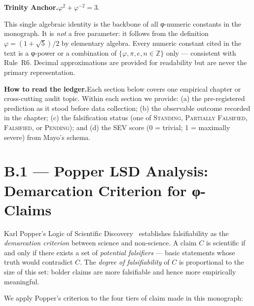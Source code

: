 \medskip

\noindent\textbf{Trinity Anchor.}\quad $\varphi^{2} + \varphi^{-2} = 3$.

\medskip

\noindent This single algebraic identity is the backbone of all φ-numeric
constants in the monograph.  It is \emph{not} a free parameter: it follows from
the definition $\varphi = (1+\sqrt{5})/2$ by elementary algebra.  Every
numeric constant cited in the text is a φ-power or a combination of
$\{φ, π, e, n \in \mathbb{Z}\}$ only — consistent with Rule~R6.  Decimal
approximations are provided for readability but are never the primary
representation.

\medskip

\noindent\textbf{How to read the ledger.}\quad Each section below covers one
empirical chapter or cross-cutting audit topic.  Within each section we provide:
(a) the pre-registered prediction as it stood before data collection;
(b) the observable outcome recorded in the chapter;
(c) the falsification status (one of \textsc{Standing}, \textsc{Partially
Falsified}, \textsc{Falsified}, or \textsc{Pending}); and
(d) the SEV score (0 = trivial; 1 = maximally severe) from Mayo's schema.

\section*{B.1 — Popper LSD Analysis: Demarcation Criterion for φ-Claims}
\label{sec:popper-lsd}

Karl Popper's Logic of Scientific Discovery~\cite{popper1959logic} establishes
falsifiability as the \emph{demarcation criterion} between science and
non-science.  A claim $C$ is scientific if and only if there exists a set of
\emph{potential falsifiers} — basic statements whose truth would contradict $C$.
The \emph{degree of falsifiability} of $C$ is proportional to the size of this
set: bolder claims are more falsifiable and hence more empirically meaningful.

\medskip

\noindent We apply Popper's criterion to the four tiers of claim made in
this monograph:

